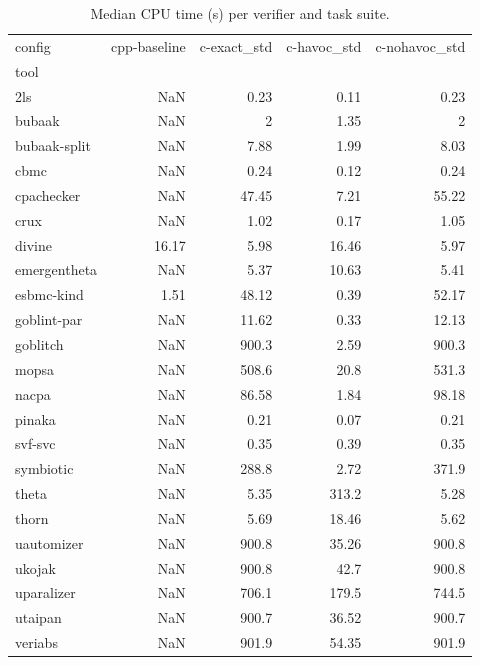 \begin{table}[t]
  \centering
  \caption{Median CPU time (s) per verifier and task suite.}
  \label{tab:cpu-median-by-tool}
\begin{tabular}{lrrrr}
\toprule
config & cpp-baseline & c-exact\_std & c-havoc\_std & c-nohavoc\_std \\
tool &  &  &  &  \\
\midrule
2ls & NaN & 0.23 & 0.11 & 0.23 \\
bubaak & NaN & 2 & 1.35 & 2 \\
bubaak-split & NaN & 7.88 & 1.99 & 8.03 \\
cbmc & NaN & 0.24 & 0.12 & 0.24 \\
cpachecker & NaN & 47.45 & 7.21 & 55.22 \\
crux & NaN & 1.02 & 0.17 & 1.05 \\
divine & 16.17 & 5.98 & 16.46 & 5.97 \\
emergentheta & NaN & 5.37 & 10.63 & 5.41 \\
esbmc-kind & 1.51 & 48.12 & 0.39 & 52.17 \\
goblint-par & NaN & 11.62 & 0.33 & 12.13 \\
goblitch & NaN & 900.3 & 2.59 & 900.3 \\
mopsa & NaN & 508.6 & 20.8 & 531.3 \\
nacpa & NaN & 86.58 & 1.84 & 98.18 \\
pinaka & NaN & 0.21 & 0.07 & 0.21 \\
svf-svc & NaN & 0.35 & 0.39 & 0.35 \\
symbiotic & NaN & 288.8 & 2.72 & 371.9 \\
theta & NaN & 5.35 & 313.2 & 5.28 \\
thorn & NaN & 5.69 & 18.46 & 5.62 \\
uautomizer & NaN & 900.8 & 35.26 & 900.8 \\
ukojak & NaN & 900.8 & 42.7 & 900.8 \\
uparalizer & NaN & 706.1 & 179.5 & 744.5 \\
utaipan & NaN & 900.7 & 36.52 & 900.7 \\
veriabs & NaN & 901.9 & 54.35 & 901.9 \\
\bottomrule
\end{tabular}
\end{table}
